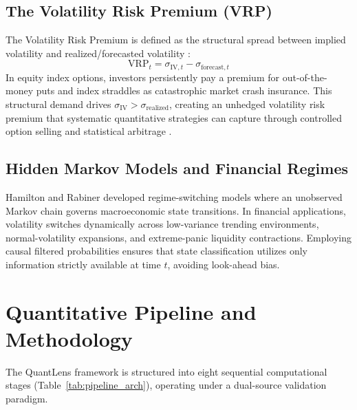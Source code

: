 \documentclass[journal]{IEEEtran}
\begin{document}
\subsection{The Volatility Risk Premium (VRP)}
The Volatility Risk Premium is defined as the structural spread between implied volatility and realized/forecasted volatility \cite{carr_wu_2009,andersen2007}:
\begin{equation}
\mathrm{VRP}_t = \sigma_{\mathrm{IV},t} - \sigma_{\mathrm{forecast},t}
\end{equation}
In equity index options, investors persistently pay a premium for out-of-the-money puts and index straddles as catastrophic market crash insurance. This structural demand drives $\sigma_{\mathrm{IV}} > \sigma_{\mathrm{realized}}$, creating an unhedged volatility risk premium that systematic quantitative strategies can capture through controlled option selling and statistical arbitrage \cite{hull2022}.

\subsection{Hidden Markov Models and Financial Regimes}
Hamilton \cite{hamilton1994} and Rabiner \cite{rabiner1989} developed regime-switching models where an unobserved Markov chain governs macroeconomic state transitions. In financial applications, volatility switches dynamically across low-variance trending environments, normal-volatility expansions, and extreme-panic liquidity contractions. Employing causal filtered probabilities ensures that state classification utilizes only information strictly available at time $t$, avoiding look-ahead bias.

\section{Quantitative Pipeline and Methodology}

The QuantLens framework is structured into eight sequential computational stages (Table~\ref{tab:pipeline_arch}), operating under a dual-source validation paradigm.
\end{document}
